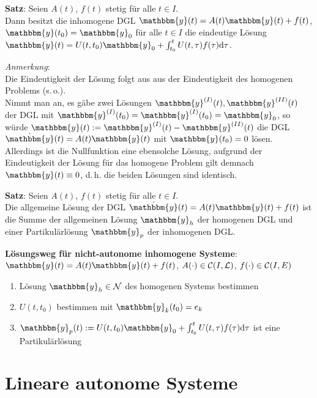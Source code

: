 \textbf{Satz}: Seien $A(t)$, $f(t)$ stetig für alle $t \in I$. \\
Dann besitzt die inhomogene DGL $\mathbbm{y}(t) = A(t) \mathbbm{y}(t) + f(t)$,
$\mathbbm{y}(t_0) = \mathbbm{y}_0$ für alle $ t \in I$
die eindeutige Lösung $\mathbbm{y}(t) = U(t, t_0) \mathbbm{y}_0 +
\int_{t_0}^t U(t, \tau) f(\tau) \d\tau$.

\emph{Anmerkung}: \\
Die Eindeutigkeit der Lösung folgt aus aus der Eindeutigkeit des homogenen
Problems (s.\,o.). \\
Nimmt man an, es gäbe zwei Lösungen
$\mathbbm{y}^{(I)}(t), \mathbbm{y}^{(II)}(t)$ der DGL mit
$\mathbbm{y}^{(I)}(t_0) = \mathbbm{y}^{(I)}(t_0) = \mathbbm{y}_0$,
so würde $\mathbbm{y}(t) := \mathbbm{y}^{(I)}(t) - \mathbbm{y}^{(II)}(t)$
die DGL $\dot{\mathbbm{y}}(t) = A(t) \mathbbm{y}(t)$ mit
$\mathbbm{y}(t_0) = 0$ lösen.
Allerdings ist die Nullfunktion eine ebensolche Lösung, aufgrund der
Eindeutigkeit der Lösung für das homogene Problem
gilt demnach $\mathbbm{y}(t) \equiv 0$, d.\,h.
die beiden Lösungen sind identisch.

\textbf{Satz}:
Seien $A(t)$, $f(t)$ stetig für alle $t \in I$. \\
Die allgemeine Lösung der DGL
$\dot{\mathbbm{y}}(t) = A(t) \mathbbm{y}(t) + f(t)$ ist die Summe
der allgemeinen Lösung $\mathbbm{y}_h$ der homogenen DGL
und einer Partikulärlösung $\mathbbm{y}_p$ der inhomogenen DGL.

\linie

\textbf{Lösungsweg für nicht-autonome inhomogene Systeme}: \\
$\dot{\mathbbm{y}}(t) = A(t) \mathbbm{y}(t) + f(t)$,
$A(\cdot) \in \mathcal{C}(I, \mathcal{L})$, $f(\cdot) \in \mathcal{C}(I, E)$
\begin{enumerate}
    \item
    Lösung $\mathbbm{y}_h \in \mathcal{N}$ des homogenen Systems bestimmen

    \item
    $U(t, t_0)$ bestimmen mit $\mathbbm{y}_k(t_0) = e_k$

    \item
    $\mathbbm{y}_p(t) := U(t, t_0) \mathbbm{y}_0 +
    \int_{t_0}^t U(t, \tau) f(\tau) \d\tau$
    ist eine Partikulärlösung
\end{enumerate}

\section{%
    Lineare autonome Systeme%
}

